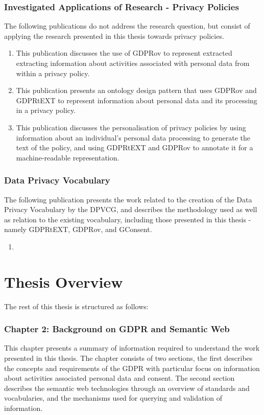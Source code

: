 \subsubsection{Investigated Applications of Research - Privacy Policies}
The following publications do not address the research question, but consist of applying the research presented in this thesis towards privacy policies.
\begin{enumerate}[resume]
    \item \textbf{}
    \newline This publication discusses the use of GDPRov to represent extracted extracting information about activities associated with personal data from within a privacy policy.
    \item \textbf{}
    \newline This publication presents an ontology design pattern that uses GDPRov and GDPRtEXT to represent information about personal data and its processing in a privacy policy.
    \item \textbf{}
    \newline This publication discusses the personalisation of privacy policies by using information about an individual's personal data processing to generate the text of the policy, and using GDPRtEXT and GDPRov to annotate it for a machine-readable representation.
\end{enumerate}

\subsubsection{Data Privacy Vocabulary}
The following publication presents the work related to the creation of the Data Privacy Vocabulary by the DPVCG, and describes the methodology used as well as relation to the existing vocabulary, including those presented in this thesis - namely GDPRtEXT, GDPRov, and GConsent.
\begin{enumerate}[resume]
    \item \textbf{}
\end{enumerate}

\section{Thesis Overview}
The rest of this thesis is structured as follows:

\subsubsection{Chapter 2: Background on GDPR and Semantic Web}
This chapter presents a summary of information required to understand the work presented in this thesis. The chapter consists of two sections, the first describes the concepts and requirements of the GDPR with particular focus on information about activities associated personal data and consent. The second section describes the semantic web technologies through an overview of standards and vocabularies, and the mechanisms used for querying and validation of information.


